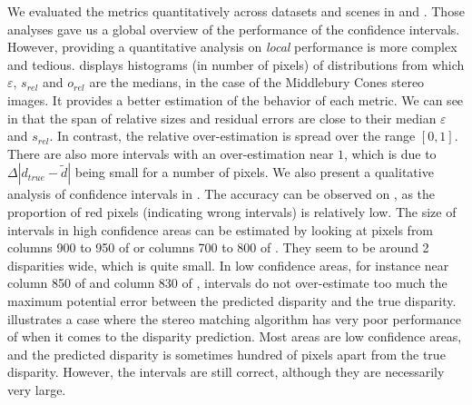 We evaluated the metrics quantitatively across datasets and scenes in  and . Those analyses gave us a global overview of the performance of the confidence intervals. However, providing a quantitative analysis on \textit{local} performance is more complex and tedious.  displays histograms (in number of pixels) of distributions from which $\varepsilon$, $s_{rel}$ and $o_{rel}$ are the medians, in the case of the Middlebury Cones stereo images. It provides a better estimation of the behavior of each metric. We can see in  that the span of relative sizes and residual errors are close to their median $\varepsilon$ and $s_{rel}$. In contrast, the relative over-estimation is spread over the range $[0,1]$. There are also more intervals with an over-estimation near $1$, which is due to $\Delta|d_{true}-\tilde{d}|$ being small for a number of pixels. We also present a qualitative analysis of confidence intervals in . The accuracy can be observed on , as the proportion of red pixels (indicating wrong intervals) is relatively low. The size of intervals in high confidence areas can be estimated by looking at pixels from columns 900 to 950 of  or columns 700 to 800 of . They seem to be around 2 disparities wide, which is quite small. In low confidence areas, for instance near column 850 of  and column 830 of , intervals do not over-estimate too much the maximum potential error between the predicted disparity and the true disparity.  illustrates a case where the stereo matching algorithm has very poor performance of when it comes to the disparity prediction. Most areas are low confidence areas, and the predicted disparity is sometimes hundred of pixels apart from the true disparity. However, the intervals are still correct, although they are necessarily very large.  

